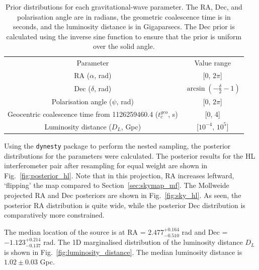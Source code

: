 \documentclass[11pt,a4paper]{article}
\begin{document}
\begin{table}[h]
    \centering
    \begin{tabular}{cc}
    Parameter & Value range \\
    RA ($\alpha$, rad) & [0, $2\pi$] \\
    Dec ($\delta$, rad) & $\arcsin(-\frac{\delta}{2}-1)$ \\
    Polarisation angle ($\psi$, rad) & [0, $2\pi$] \\
    Geocentric coalescence time from 1126259460.4 ($t_c^{geo}$, s) & [0, 4] \\
    Luminosity distance ($D_L$, Gpc) & [$10^{-4}$, $10^5$] \\
    \end{tabular}
    \caption{Prior distributions for each gravitational-wave parameter. The RA, Dec, and polarisation angle are in radians, the geometric coalescence time is in seconds, and the luminosity distance is in Gigaparsecs. The Dec prior is calculated using the inverse sine function to ensure that the prior is uniform over the solid angle.}
    \label{tab:priors}
\end{table}

Using the \texttt{dynesty} package to perform the nested sampling, the posterior distributions for the parameters were calculated. The posterior results for the HL interferometer pair after resampling for equal weight are shown in Fig.~\ref{fig:posterior_hl}. Note that in this projection, RA increases leftward, `flipping' the map compared to Section~\ref{sec:skymap_mf}. The Mollweide projected RA and Dec posteriors are shown in Fig.~\ref{fig:sky_hl}. As seen, the posterior RA distribution is quite wide, while the posterior Dec distribution is comparatively more constrained.

The median location of the source is at RA = $2.477^{+0.164}_{-0.510}$ rad and Dec = $-1.123^{+0.214}_{-0.137}$ rad. The 1D marginalised distribution of the luminosity distance $D_L$ is shown in Fig.~\ref{fig:luminosity_distance}. The median luminosity distance is $1.02 \pm 0.03$ Gpc.
\end{document}
